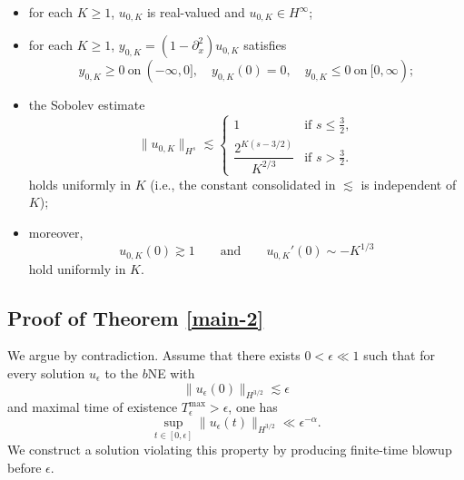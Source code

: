 \documentclass{amsart}
\begin{document}
\begin{itemize}

\item for each $K\geq1$, $u_{0, K}$ is real-valued and $u_{0,K}\in H^\infty$;

\item for each $K\geq1$, $y_{0,K}=(1-\partial^2_x)u_{0,K}$ satisfies
\begin{equation}\label{y0k}
y_{0, K}\geq 0\ \text{on}\ (-\infty, 0], \quad y_{0, K}(0)=0, \quad y_{0, K}\leq 0 \ \text{on}\ [0,\infty);
\end{equation}

\item the Sobolev estimate
\begin{equation*}
\|u_{0, K}\|_{H^s}\lesssim
\begin{cases}
1 & \text{if } s \leq \tfrac{3}{2}, \\
\dfrac{2^{K(s - 3/2)}}{K^{2/3}} & \text{if } s > \tfrac{3}{2}.
\end{cases}
\end{equation*}
holds uniformly in $K$ (i.e., the constant consolidated in $\lesssim$ is independent of $K$);

\item moreover,
\begin{equation} u_{0,K}(0)\gtrsim 1\qquad \text{and}\qquad
u_{0, K}'(0)\sim -K^{1/3}\label{u0k}
\end{equation}
hold uniformly in $K$.
\end{itemize}

\subsection*{Proof of Theorem \ref{main-2}}
We argue by contradiction. Assume that there exists $0<\epsilon\ll1$ such that for every solution $u_\epsilon$ to the $b$NE with 
\[
\|u_\epsilon(0)\|_{H^{3/2}}\lesssim \epsilon
\] 
and maximal time of existence $T^{\text{max}}_\epsilon>\epsilon$, one has
\begin{equation*}
\sup_{t\in [0,\epsilon]} \|u_\epsilon(t)\|_{H^{3/2}}\ll \epsilon^{-\alpha}.
\end{equation*}
We construct a solution violating this property by producing finite-time blowup before $\epsilon$.
\end{document}
